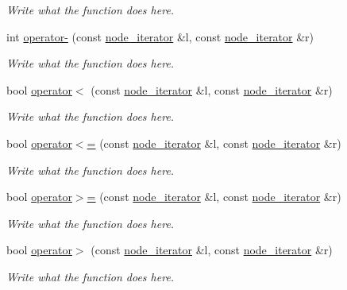 \begin{DoxyCompactItemize}
\begin{DoxyCompactList}\small\item\em Write what the function does here. \end{DoxyCompactList}\item 
int \hyperlink{classgraph_1_1node__iterator_aca04993c54f56e95d1be14feaeb7766f}{operator-\/} (const \hyperlink{classgraph_1_1node__iterator}{node\+\_\+iterator} \&l, const \hyperlink{classgraph_1_1node__iterator}{node\+\_\+iterator} \&r)
\begin{DoxyCompactList}\small\item\em Write what the function does here. \end{DoxyCompactList}\item 
bool \hyperlink{classgraph_1_1node__iterator_a545664b456b4e3c268ad91fec9e530b5}{operator$<$} (const \hyperlink{classgraph_1_1node__iterator}{node\+\_\+iterator} \&l, const \hyperlink{classgraph_1_1node__iterator}{node\+\_\+iterator} \&r)
\begin{DoxyCompactList}\small\item\em Write what the function does here. \end{DoxyCompactList}\item 
bool \hyperlink{classgraph_1_1node__iterator_a538fbcfacacb3cf1ac7d3041b3342dc3}{operator$<$=} (const \hyperlink{classgraph_1_1node__iterator}{node\+\_\+iterator} \&l, const \hyperlink{classgraph_1_1node__iterator}{node\+\_\+iterator} \&r)
\begin{DoxyCompactList}\small\item\em Write what the function does here. \end{DoxyCompactList}\item 
bool \hyperlink{classgraph_1_1node__iterator_a5d35f6f6fdf2dfeb5a7cdac7649b216f}{operator$>$=} (const \hyperlink{classgraph_1_1node__iterator}{node\+\_\+iterator} \&l, const \hyperlink{classgraph_1_1node__iterator}{node\+\_\+iterator} \&r)
\begin{DoxyCompactList}\small\item\em Write what the function does here. \end{DoxyCompactList}\item 
bool \hyperlink{classgraph_1_1node__iterator_a74e84d83365092b345464ea91fc1b46c}{operator$>$} (const \hyperlink{classgraph_1_1node__iterator}{node\+\_\+iterator} \&l, const \hyperlink{classgraph_1_1node__iterator}{node\+\_\+iterator} \&r)
\begin{DoxyCompactList}\small\item\em Write what the function does here. \end{DoxyCompactList}\end{DoxyCompactItemize}


